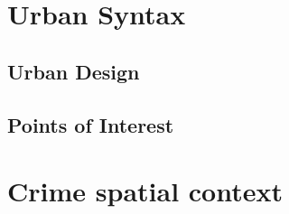 \documentclass[runningheads]{llncs}
\begin{document}


\section{Urban Syntax}
\subsection{Urban Design}

\subsection{Points of Interest}

\section{Crime spatial context }





\end{document}
